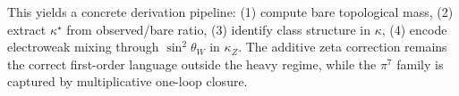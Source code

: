 \medskip
This yields a concrete derivation pipeline: (1) compute bare topological mass, (2) extract $\kappa^\star$ from observed/bare ratio, (3) identify class structure in $\kappa$, (4) encode electroweak mixing through $\sin^2\theta_W$ in $\kappa_Z$. The additive zeta correction remains the correct first-order language outside the heavy regime, while the $\pi^7$ family is captured by multiplicative one-loop closure.
